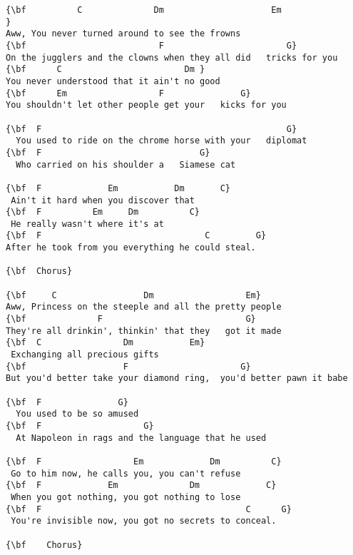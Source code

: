 \documentclass[a4paper]{article}
\begin{document}
\begin{Verbatim}[commandchars=\\\{\}]
{\bf          C              Dm                     Em                                            }
Aww, You never turned around to see the frowns 
{\bf                          F                        G}
On the jugglers and the clowns when they all did   tricks for you
{\bf      C                        Dm }
You never understood that it ain't no good
{\bf      Em                  F               G}
You shouldn't let other people get your   kicks for you

{\bf  F                                                G}
  You used to ride on the chrome horse with your   diplomat
{\bf  F                               G}
  Who carried on his shoulder a   Siamese cat

{\bf  F             Em           Dm       C}
 Ain't it hard when you discover that
{\bf  F          Em     Dm          C}
 He really wasn't where it's at
{\bf  F                                C         G}
After he took from you everything he could steal.

{\bf  Chorus}

{\bf     C                 Dm                  Em}
Aww, Princess on the steeple and all the pretty people
{\bf              F                            G}
They're all drinkin', thinkin' that they   got it made
{\bf  C                Dm           Em}
 Exchanging all precious gifts
{\bf                   F                      G}
But you'd better take your diamond ring,  you'd better pawn it babe

{\bf  F               G}
  You used to be so amused
{\bf  F                    G}
  At Napoleon in rags and the language that he used

{\bf  F                  Em             Dm          C}
 Go to him now, he calls you, you can't refuse
{\bf  F             Em              Dm             C}
 When you got nothing, you got nothing to lose
{\bf  F                                        C      G}
 You're invisible now, you got no secrets to conceal.

{\bf    Chorus}

\end{Verbatim}
\newpage
\end{document}

